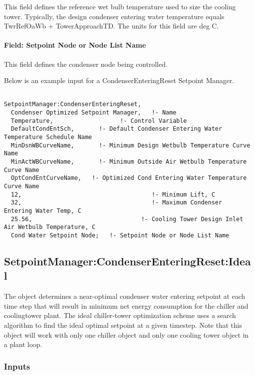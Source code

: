 This field defines the reference wet bulb temperature used to size the cooling tower. Typically, the design condenser entering water temperature equals TwrRefOaWb + TowerApproachTD. The units for this field are deg C.

\paragraph{Field: Setpoint Node or Node List Name}\label{field-setpoint-node-or-node-list-name}

This field defines the condenser node being controlled.

Below is an example input for a CondenserEnteringReset Setpoint Manager.

\begin{lstlisting}

SetpointManager:CondenserEnteringReset,
  Condenser Optimized Setpoint Manager,   !- Name
  Temperature,                   !- Control Variable
  DefaultCondEntSch,       !- Default Condenser Entering Water Temperature Schedule Name
  MinDsnWBCurveName,       !- Minimum Design Wetbulb Temperature Curve Name
  MinActWBCurveName,       !- Minimum Outside Air Wetbulb Temperature Curve Name
  OptCondEntCurveName,   !- Optimized Cond Entering Water Temperature Curve Name
  12,                                     !- Minimum Lift, C
  32,                                     !- Maximum Condenser Entering Water Temp, C
  25.56,                               !- Cooling Tower Design Inlet Air Wetbulb Temperature, C
  Cond Water Setpoint Node;   !- Setpoint Node or Node List Name
\end{lstlisting}

\subsection{SetpointManager:CondenserEnteringReset:Ideal}\label{setpointmanagercondenserenteringresetideal}

The object determines a near-optimal condenser water entering setpoint at each time step that will result in minimum net energy consumption for the chiller and coolingtower plant. The ideal chiller-tower optimization scheme uses a search algorithm to find the ideal optimal setpoint at a given timestep. Note that this object will work with only one chiller object and only one cooling tower object in a plant loop.

\subsubsection{Inputs}\label{inputs-24-002}

